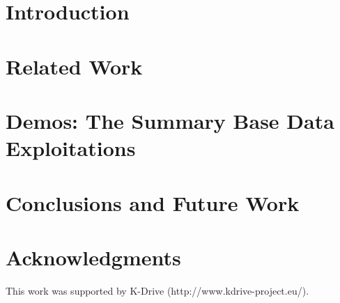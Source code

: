 \documentclass{llncs}
\begin{document}
\section{Introduction}\label{sec:Introduction}


\section{Related Work}\label{sec:RelatedWork}




\section{Demos: The Summary Base Data Exploitations }

%


\section{Conclusions and Future Work}\label{sec:Conclusions}





\section*{Acknowledgments}

This work was supported by K-Drive (http://www.kdrive-project.eu/).



%






\clearpage
{} %
\renewcommand{\indexname}{Author Index}
\printindex \clearpage
{} %
\renewcommand{\indexname}{Subject Index}
%
\end{document}
